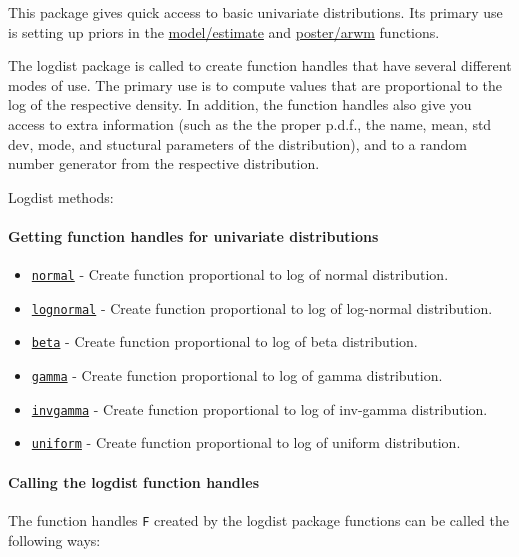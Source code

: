 

	This package gives quick access to basic univariate distributions. Its
 primary use is setting up priors in the \url{model/estimate} and
 \url{poster/arwm} functions.
 
 The logdist package is called to create function handles that have
 several different modes of use. The primary use is to compute values
 that are proportional to the log of the respective density. In addition,
 the function handles also give you access to extra information (such as
 the the proper p.d.f., the name, mean, std dev, mode, and stuctural
 parameters of the distribution), and to a random number generator from
 the respective distribution.
 
 Logdist methods:
 
 \paragraph{Getting function handles for univariate distributions}
 
 \begin{itemize}
 \item
   \href{logdist/normal}{\texttt{normal}} - Create function proportional
   to log of normal distribution.
 \item
   \href{logdist/lognormal}{\texttt{lognormal}} - Create function
   proportional to log of log-normal distribution.
 \item
   \href{logdist/beta}{\texttt{beta}} - Create function proportional to
   log of beta distribution.
 \item
   \href{logdist/gamma}{\texttt{gamma}} - Create function proportional to
   log of gamma distribution.
 \item
   \href{logdist/invgamma}{\texttt{invgamma}} - Create function
   proportional to log of inv-gamma distribution.
 \item
   \href{logdist/uniform}{\texttt{uniform}} - Create function
   proportional to log of uniform distribution.
 \end{itemize}
 
 \paragraph{Calling the logdist function handles}
 
 The function handles \texttt{F} created by the logdist package functions
 can be called the following ways:
 
